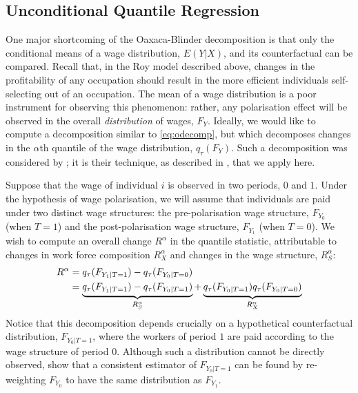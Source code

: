 \subsection{Unconditional Quantile Regression}
One major shortcoming of the Oaxaca-Blinder decomposition is that only the conditional means of a wage distribution, $E(Y|X)$, and its counterfactual can be compared. Recall that, in the Roy model described above, changes in the profitability of any occupation should result in the more efficient individuals self-selecting out of an occupation. The mean of a wage distribution is a poor instrument for observing this phenomenon: rather, any polarisation effect will be observed in the overall {\em distribution} of wages, $F_Y$. Ideally, we would like to compute a decomposition similar to \eqref{eq:odecomp}, but which decomposes changes in the $\alpha$th quantile of the wage distribution, $q_\tau(F_Y)$. Such a decomposition was considered by \citet{Firpo2011}; it is their technique, as described in \citet{Firpo2009}, that we apply here.

Suppose that the wage of individual $i$ is observed in two periods, $0$ and $1$. Under the hypothesis of wage polarisation, we will assume that individuals are paid under two distinct wage structures: the pre-polarisation wage structure, $F_{Y_0}$ (when $T=1$) and the post-polarisation wage structure, $F_{Y_1}$ (when $T=0$). We wish to compute an overall change $R^\alpha$ in the quantile statistic, attributable to changes in work force composition $R^\alpha_X$ and changes in the wage structure, $R^\alpha_S$:
\begin{align}
  R^\alpha &= q_\tau(F_{Y_1|T=1}) - q_\tau(F_{Y_0|T=0}) \notag \\
  &= \underbrace{q_\tau(F_{Y_1|T=1}) -  q_\tau(F_{Y_0|T=1})}_{R^\alpha_S} + \underbrace{q_\tau(F_{Y_0|T=1}) q_\tau(F_{Y_0|T=0})}_{R^\alpha_X} \label{eq:decomp}
\end{align}Notice that this decomposition depends crucially on a hypothetical counterfactual distribution, $F_{Y_0|T=1}$, where the workers of period $1$ are paid according to the wage structure of period $0$. Although such a distribution cannot be directly observed, \citet{Firpo2011} show that a consistent estimator of $F_{Y_0|T=1}$ can be found by re-weighting $F_{Y_0}$ to have the same distribution as $F_{Y_1}$.

